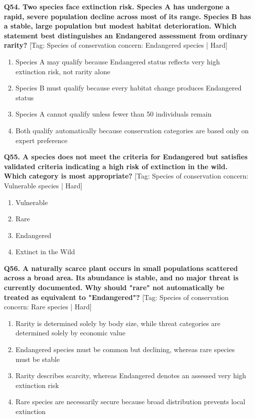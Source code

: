 \noindent\textbf{Q54. Two species face extinction risk. Species A has undergone a rapid, severe population decline across most of its range. Species B has a stable, large population but modest habitat deterioration. Which statement best distinguishes an Endangered assessment from ordinary rarity?} \hfill [Tag: Species of conservation concern: Endangered species | Hard]
\begin{enumerate}[label=(\alph*),topsep=2pt,itemsep=1pt,partopsep=0pt,parsep=0pt]
    \item {Species A may qualify because Endangered status reflects very high extinction risk, not rarity alone}
    \item {Species B must qualify because every habitat change produces Endangered status}
    \item {Species A cannot qualify unless fewer than 50 individuals remain}
    \item {Both qualify automatically because conservation categories are based only on expert preference}
\end{enumerate}
\vspace{2mm}

\noindent\textbf{Q55. A species does not meet the criteria for Endangered but satisfies validated criteria indicating a high risk of extinction in the wild. Which category is most appropriate?} \hfill [Tag: Species of conservation concern: Vulnerable species | Hard]
\begin{enumerate}[label=(\alph*),topsep=2pt,itemsep=1pt,partopsep=0pt,parsep=0pt]
    \item {Vulnerable}
    \item {Rare}
    \item {Endangered}
    \item {Extinct in the Wild}
\end{enumerate}
\vspace{2mm}

\noindent\textbf{Q56. A naturally scarce plant occurs in small populations scattered across a broad area. Its abundance is stable, and no major threat is currently documented. Why should "rare" not automatically be treated as equivalent to "Endangered"?} \hfill [Tag: Species of conservation concern: Rare species | Hard]
\begin{enumerate}[label=(\alph*),topsep=2pt,itemsep=1pt,partopsep=0pt,parsep=0pt]
    \item {Rarity is determined solely by body size, while threat categories are determined solely by economic value}
    \item {Endangered species must be common but declining, whereas rare species must be stable}
    \item {Rarity describes scarcity, whereas Endangered denotes an assessed very high extinction risk}
    \item {Rare species are necessarily secure because broad distribution prevents local extinction}
\end{enumerate}
\vspace{2mm}

